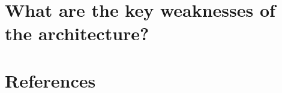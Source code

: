 \documentclass[a4paper]{article}
\begin{document}
\section{What  are the key weaknesses of the architecture?} %


\section{References} %

\end{document}
